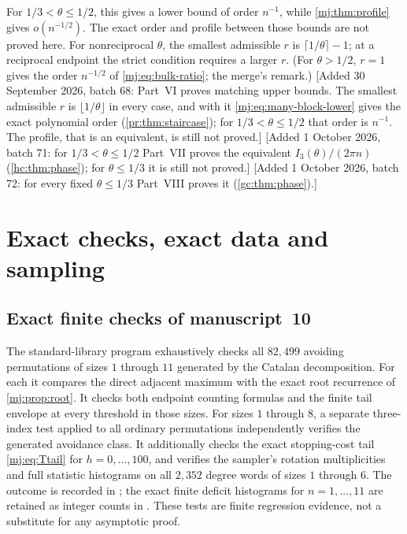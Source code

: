 \documentclass[11pt,a4paper]{article}
\theoremstyle{definition}\newaliascnt{definition}{theorem}
\theoremstyle{remark}\newaliascnt{remark}{theorem}
\begin{document}
For $1/3<\theta\le1/2$, this gives a lower bound of order $n^{-1}$, while
\cref{mj:thm:profile} gives $o(n^{-1/2})$. The exact order and profile
between those bounds are not proved here. For nonreciprocal $\theta$, the
smallest admissible $r$ is $\lceil1/\theta\rceil-1$; at a reciprocal endpoint
the strict condition requires a larger $r$. (For $\theta>1/2$, $r=1$ gives
the order $n^{-1/2}$ of \eqref{mj:eq:bulk-ratio}; the merge's remark.)
[Added 30 September 2026, batch 68: Part~VI proves matching upper bounds.
The smallest admissible $r$ is $\lfloor1/\theta\rfloor$ in every case, and
with it \eqref{mj:eq:many-block-lower} gives the exact polynomial order
(\cref{pr:thm:staircase}); for $1/3<\theta\le1/2$ that order is $n^{-1}$.
The profile, that is an equivalent, is still not proved.]
[Added 1 October 2026, batch 71: for $1/3<\theta\le1/2$ Part~VII proves the
equivalent $I_3(\theta)/(2\pi n)$ (\cref{hc:thm:phase}); for $\theta\le1/3$
it is still not proved.]
[Added 1 October 2026, batch 72: for every fixed $\theta\le1/3$ Part~VIII
proves it (\cref{gc:thm:phase}).]

\section{Exact checks, exact data and sampling}
\label{mj:sec:checks}

\subsection{Exact finite checks of manuscript~10}
The standard-library program 
exhaustively checks all $82{,}499$ avoiding permutations of sizes $1$
through $11$ generated by the Catalan decomposition. For each it compares the
direct adjacent maximum with the exact root recurrence of
\cref{mj:prop:root}. It checks both endpoint counting formulas and the finite
tail envelope at every threshold in those sizes. For sizes $1$ through $8$, a
separate three-index test applied to all ordinary permutations independently
verifies the generated avoidance class. It additionally checks the exact
stopping-cost tail \eqref{mj:eq:Ttail} for $h=0,\ldots,100$, and verifies the
sampler's rotation multiplicities and full statistic histograms on all
$2{,}352$ degree words of sizes $1$ through $6$. The outcome is recorded in
; the exact finite deficit
histograms for $n=1,\ldots,11$ are retained as integer counts in
. These tests are
finite regression evidence, not a substitute for any asymptotic proof.
\end{document}
